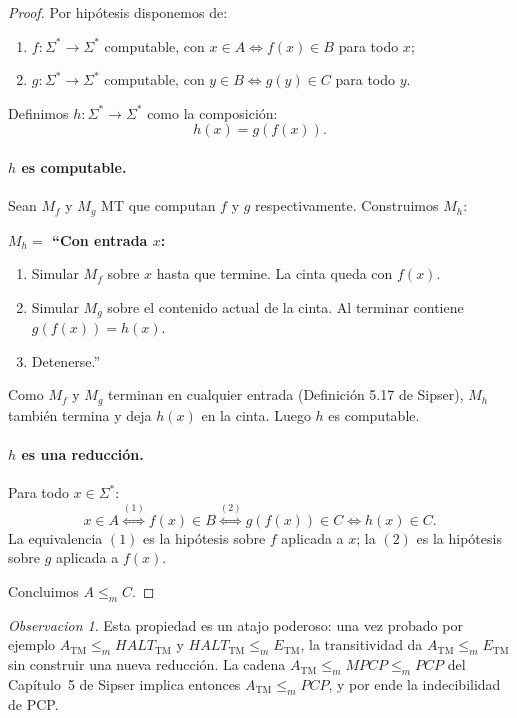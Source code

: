 \documentclass[11pt,a4paper]{article}
\theoremstyle{plain}
\theoremstyle{definition}
\theoremstyle{remark}
\newtheorem*{observacion}{Observacion}
\newcommand{\TM}{\mathrm{TM}}
\newcommand{\Sstar}{\Sigma^{*}}
\newcommand{\redm}{\le_{m}}
\newcommand{\ATM}{A_{\TM}}
\newcommand{\HALT}{\mathit{HALT}_{\TM}}
\newcommand{\ETM}{E_{\TM}}
\begin{document}
\begin{proof}
Por hip\'otesis disponemos de:
\begin{enumerate}
  \item $f:\Sstar\to\Sstar$ computable, con $x\in A \iff f(x)\in B$ para todo $x$;
  \item $g:\Sstar\to\Sstar$ computable, con $y\in B \iff g(y)\in C$ para todo $y$.
\end{enumerate}

Definimos $h:\Sstar\to\Sstar$ como la composici\'on:
\[
  h(x) = g(f(x)).
\]

\paragraph{$h$ es computable.}
Sean $M_f$ y $M_g$ MT que computan $f$ y $g$ respectivamente. Construimos
$M_h$:

\medskip\noindent\textbf{$M_h=$ ``Con entrada $x$:}
\begin{enumerate}
  \item Simular $M_f$ sobre $x$ hasta que termine. La cinta queda con $f(x)$.
  \item Simular $M_g$ sobre el contenido actual de la cinta. Al terminar
        contiene $g(f(x))=h(x)$.
  \item Detenerse.''
\end{enumerate}
\medskip

Como $M_f$ y $M_g$ terminan en cualquier entrada (Definici\'on 5.17 de
Sipser), $M_h$ tambi\'en termina y deja $h(x)$ en la cinta. Luego $h$
es computable.

\paragraph{$h$ es una reducci\'on.}
Para todo $x\in\Sstar$:
\[
  x\in A
  \stackrel{(1)}{\iff} f(x)\in B
  \stackrel{(2)}{\iff} g(f(x))\in C
  \iff h(x)\in C.
\]
La equivalencia $(1)$ es la hip\'otesis sobre $f$ aplicada a $x$;
la $(2)$ es la hip\'otesis sobre $g$ aplicada a $f(x)$.

Concluimos $A\redm C$.
\end{proof}

\begin{observacion}
Esta propiedad es un atajo poderoso: una vez probado por ejemplo
$\ATM \redm \HALT$ y $\HALT \redm \ETM$, la transitividad da
$\ATM \redm \ETM$ sin construir una nueva reducci\'on. La cadena
$\ATM \redm MPCP \redm PCP$ del Cap\'itulo~5 de Sipser
implica entonces $\ATM \redm PCP$, y por ende la indecibilidad de PCP.
\end{observacion}
\end{document}
